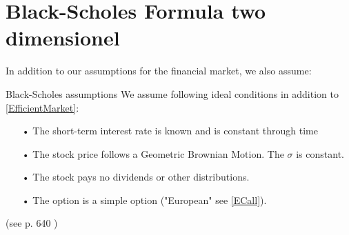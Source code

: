 
\section{Black-Scholes Formula two dimensionel}
In addition to our assumptions for the financial market, we also assume:\\
\theoremstyle{assumption}
\begin{assumption}{Black-Scholes assumptions}\label{BS-Assumption}
We assume following ideal conditions in addition to \eqref{EfficientMarket}:
\begin{enumerate}
\item[•] The short-term interest rate is known and is constant through time 
\item[•] The stock price follows a Geometric Brownian Motion. The $\sigma$ is constant.\item[•] The stock pays no dividends or other distributions.
\item[•] The option is a simple option ("European" see \eqref{ECall}).
\end{enumerate}
(see p. 640 \parencite{B-S-Paper})
\end{assumption}

\parencite{finKont}

